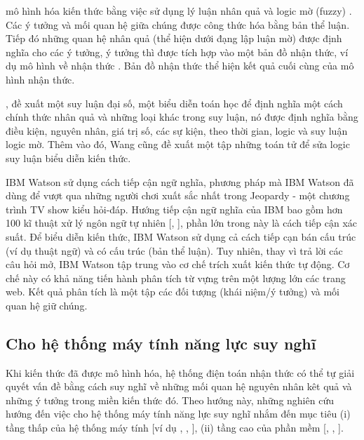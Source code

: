 \documentclass{article}
\begin{document}
 mô hình hóa kiến thức bằng việc sử dụng lý luận nhân quả \citep{heckerman1995decision} và logic mờ (fuzzy) \citep{dunbar2007evolution}. Các ý tưởng và mối quan hệ giữa chúng được công thức hóa bằng bản thể luận. Tiếp đó những quan hệ nhân quả (thể hiện dưới đạng lập luận mờ) được định nghĩa cho các ý tưởng, ý tưởng thì được tích hợp vào một bản đồ nhận thức, ví dụ mô hình về nhận thức \citep{eden1992nature}. Bản đồ nhận thức thể hiện kết quả cuối cùng của mô hình nhận thức.

\citet{wang2012denotational}, \citet{wang2012inference} đề xuất một suy luận đại số, một biểu diễn toán học để định nghĩa một cách chính thức nhân quả và những loại khác trong suy luận, nó được định nghĩa bằng điều kiện, nguyên nhân, giá trị số, các sự kiện, theo thời gian, logic và suy luận logic mờ. Thêm vào đó, Wang cũng đề xuất một tập những toán tử để sửa logic suy luận biểu diễn kiến thức.

IBM Watson \cite{ferrucci2012introduction} sử dụng cách tiếp cận ngữ nghĩa, phương pháp mà IBM Watson đã dùng để vượt qua những người chơi xuất sắc nhất trong Jeopardy - một chương trình TV show kiểu hỏi-đáp. Hướng tiếp cận ngữ nghĩa của IBM bao gồm hơn 100 kĩ thuật xử lý ngôn ngữ tự nhiên [\citet{ferrucci2010building}, \citet{gliozzo2013semantic}], phần lớn trong này là cách tiếp cận xác suất. Để biểu diễn kiến thức, IBM Watson sử dụng cả cách tiếp cạn bán cấu trúc (ví dụ thuật ngữ) và có cấu trúc (bản thể luận). Tuy nhiên, thay vì trả lời các câu hỏi mở, IBM Watson tập trung vào cơ chế trích xuất kiến thức tự động. Cơ chế này có khả năng tiến hành phân tích từ vựng trên một lượng lớn các trang web. Kết quả phân tích là một tập các đối tượng (khái niệm/ý tưởng) và mối quan hệ giữ chúng.

\subsection{Cho hệ thống máy tính năng lực suy nghĩ}

Khi kiến thức đã được mô hình hóa, hệ thống điện toán nhận thức có thể tự giải quyết vấn đề bằng cách suy nghĩ về những mối quan hệ nguyên nhân kêt quả và những ý tưởng trong miền kiến thức đó. Theo hướng này, những nghiên cứu hướng đến việc cho hệ thống máy tính năng lực suy nghĩ nhắm đến mục tiêu 
(i) tầng thấp của hệ thống máy tính [ví dụ \citet{arthur2012building}, \citet{imam2012digital}, \citet{dunbar2007evolution}],
(ii) tầng cao của phần mềm [\citet{amir2013cognitive}, \citet{lawniczak2010computational}, \citet{wang2013cognitive}].
\end{document}
